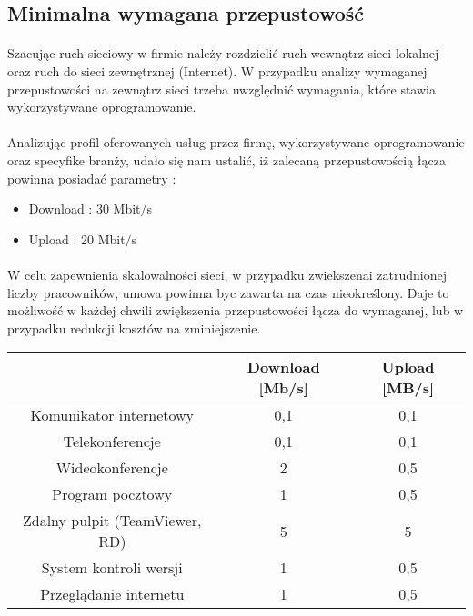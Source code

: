 \subsection{Minimalna wymagana przepustowość}
\paragraph{}
Szacując ruch sieciowy w firmie należy rozdzielić ruch wewnątrz sieci lokalnej oraz ruch do sieci zewnętrznej (Internet). W przypadku analizy wymaganej przepustowości na zewnątrz sieci trzeba uwzględnić wymagania, które stawia wykorzystywane oprogramowanie.
\paragraph{}
Analizując profil oferowanych usług przez firmę, wykorzystywane oprogramowanie oraz specyfike branży, udało się nam ustalić, iż zalecaną przepustowością łącza powinna posiadać parametry :
\begin{itemize}
	\item Download : 30 Mbit$/$s
	\item Upload : 20 Mbit$/$s
\end{itemize}
\paragraph{}
W celu zapewnienia skalowalności sieci, w przypadku zwiekszenai zatrudnionej liczby pracowników, umowa powinna byc zawarta na czas nieokreślony. Daje to możliwość w każdej chwili zwiększenia przepustowości łącza do wymaganej, lub w przypadku redukcji kosztów na zminiejszenie.

\begin{center}
    \begin{tabular}{|c|c|c|}
    \hline
       & Download [Mb/s]                & Upload [MB/s] \\ \hline
       Komunikator internetowy          & 0,1   & 0,1   \\ \hline
       Telekonferencje                  & 0,1   & 0,1   \\ \hline
       Wideokonferencje                 & 2     & 0,5   \\ \hline
       Program pocztowy                 & 1     & 0,5   \\ \hline
       Zdalny pulpit (TeamViewer, RD)   & 5     & 5     \\ \hline
       System kontroli wersji           & 1     & 0,5   \\ \hline
       Przeglądanie internetu           & 1     & 0,5   \\ \hline
   \end{tabular}
\end{center}

